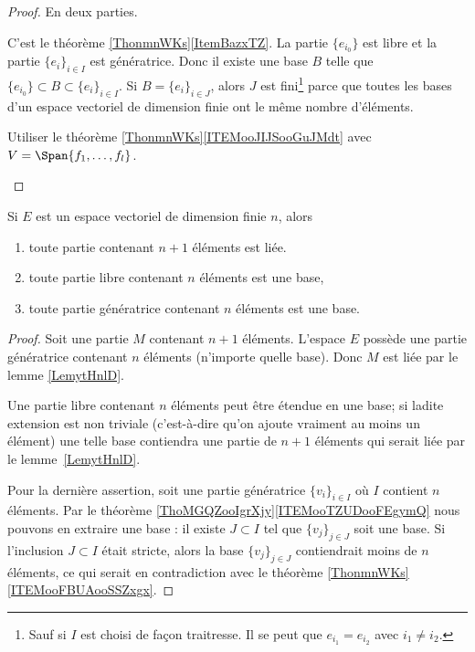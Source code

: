 \begin{proof}
	En deux parties.
	\begin{subproof}
		C'est le théorème \ref{ThonmnWKs}\ref{ItemBazxTZ}. La partie \( \{ e_{i_0} \}\) est libre et la partie \( \{ e_i \}_{i\in I}\) est génératrice. Donc il existe une base \( B\) telle que \( \{ e_{i_0} \}\subset B\subset\{ e_i \}_{i\in I}\). Si \( B=\{ e_i \}_{i\in J}\), alors \( J\) est fini\footnote{Sauf si \( I\) est choisi de façon traitresse. Il se peut que \( e_{i_1}=e_{i_2}\) avec \( i_1\neq i_2\).} parce que toutes les bases d'un espace vectoriel de dimension finie ont le même nombre d'éléments.

		Utiliser le théorème \ref{ThonmnWKs}\ref{ITEMooJIJSooGuJMdt} avec \( V=\Span\{ f_1,\ldots,f_l \}\).
	\end{subproof}
\end{proof}

\begin{proposition}     \label{PROPooVEVCooHkrldw}
	Si \( E\) est un espace vectoriel de dimension finie \( n\), alors
	\begin{enumerate}
		\item       \label{ITEMooZNLDooBISkJyBS}
		      toute partie contenant \( n+1\) éléments est liée.
		\item       \label{ITEMooSGGCooOUsuBs}
		      toute partie libre contenant \( n\) éléments est une base,
		\item
		      toute partie génératrice contenant \( n\) éléments est une base.
	\end{enumerate}
\end{proposition}

\begin{proof}
	Soit une partie \( M\) contenant \( n+1\) éléments. L'espace \( E\) possède une partie génératrice contenant \( n\) éléments (n'importe quelle base). Donc \( M\) est liée par le lemme \ref{LemytHnlD}.

	Une partie libre contenant \( n\) éléments peut être étendue en une base; si ladite extension est non triviale (c'est-à-dire qu'on ajoute vraiment au moins un élément) une telle base contiendra une partie de \( n+1\) éléments qui serait liée par le lemme~\ref{LemytHnlD}.

	Pour la dernière assertion, soit une partie génératrice \( \{ v_i \}_{i\in I}\) où \( I\) contient \( n\) éléments. Par le théorème \ref{ThoMGQZooIgrXjy}\ref{ITEMooTZUDooFEgymQ} nous pouvons en extraire une base : il existe \( J\subset I\) tel que \( \{ v_j \}_{j\in J}\) soit une base. Si l'inclusion \( J\subset I\) était stricte, alors la base \( \{ v_j \}_{j\in J}\) contiendrait moins de \( n\) éléments, ce qui serait en contradiction avec le théorème \ref{ThonmnWKs}\ref{ITEMooFBUAooSSZxgx}.
\end{proof}

